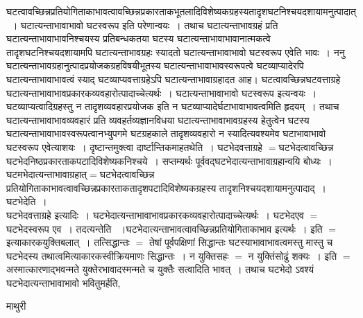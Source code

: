 \documentclass[10pt, openany]{book}
\begin{document}
{घटत्वावच्छिन्नप्रतियोगिताकाभावत्वावच्छिन्नप्रकारताकभूतलादिविशेष्यकग्रहस्यतादृशघटनिश्चयदशायामनुत्पादात्~। घटात्यन्ताभावाभावो घटस्वरूप इति परेणान्वयः~। तथाच घटात्यन्ताभावग्रहं प्रति घटात्यन्ताभावाभावनिश्चयस्य प्रतिबन्धकतया घटस्य घटात्यन्ताभावाभावानात्मकत्वे तादृशघटनिश्चयदशायामपि घटात्यन्ताभावग्रहः स्यादतो घटात्यन्ताभावाभावो घटस्वरूप एवेति भावः~। ननु घटात्यन्ताभावग्रहानुत्पादप्रयोजकग्रहविषयीभूतस्य घटात्यन्ताभावाभावस्वरूपत्वे घटव्याप्यादेरपि घटात्यन्ताभावाभावत्वं स्याद् घटव्याप्यवत्ताग्रहेऽपि घटात्यन्ताभावाग्रहादत आह। घटत्वावच्छिन्नघटवत्ताग्रहे घटात्यन्ताभावाभावप्रकारकव्यवहारोत्पादाच्चेत्यर्थः~। घटात्यन्ताभावाभावो घटस्वरूप इत्यन्वयः~। घटव्याप्यत्वादिग्रहस्तु न तादृशव्यवहारप्रयोजक इति न घटव्याप्यादेर्घटाभावाभावत्वमिति हृदयम्~। तथाच घटात्यन्ताभावाभावव्यवहारं प्रति व्यवहर्तव्यज्ञानविधया घटात्यन्ताभावाभावग्रहस्य हेतुत्वेन घटस्य घटात्यन्ताभावाभावस्वरूपत्वानभ्युपगमे घटग्रहकाले तादृशव्यवहारो न स्यादित्यवश्यमेव घटाभावाभावो घटस्वरूप एवेत्याशयः~। दृष्टान्तमुक्त्वा दार्ष्टान्तिकमाहतथेति~। घटभेदवत्ताग्रहे $=$घटभेदत्वावच्छिन्न घटभेदनिष्ठप्रकारताकपटादिविशेष्यकनिश्चये~। सप्तम्यर्थः पूर्ववद्घटभेदात्यन्ताभावाग्रहान्वयि बोध्यः~। घटमभेदात्यन्ताभावाग्रहात्$=$घटभेदत्वावच्छिन्न प्रतियोगिताकाभावत्वावच्छिन्नप्रकारताकतादृशपटादिविशेष्यकग्रहस्य तादृशनिश्चयदशायामनुत्पादाद्~। {\qt घटभेदेति~}।\\

घटभेदवत्ताग्रहे इत्यादिः~। घटभेदात्यन्ताभावाभावप्रकारकव्यवहारोत्पादाच्चेत्यर्थः~। घटभेदएव $=$ घटभेदस्वरूप एव~। {\qt तदत्यन्तेति}~ ।घटभेदात्यन्ताभावत्वावच्छिन्नप्रतियोगिताकाभाव इत्यर्थः~। इति $=$ इत्याकारकयुक्तिबलात्~। तत्सिद्धान्तः $=$ तेषां पूर्वपक्षिणां सिद्धान्तः घटस्याभावाभावत्वमस्तु मास्तु च घटभेदस्य तथात्वमित्याकारकस्वीक्रियमाणः सिद्धान्तः~। न युक्तिसहः $=$ न युक्तिंसोढुं शक्यः~। इति $=$ अस्मात्कारणाद्भवन्मते युक्तेरभावादस्मन्मते च युक्तैः सत्वादिति भावत्~। तथाच घटभेदो ऽवश्यं घटभेदात्यन्ताभावाभावो भवितुमर्हति,
\newpage
\begin{center}  माथुरी  \end{center}

}
\end{document}
